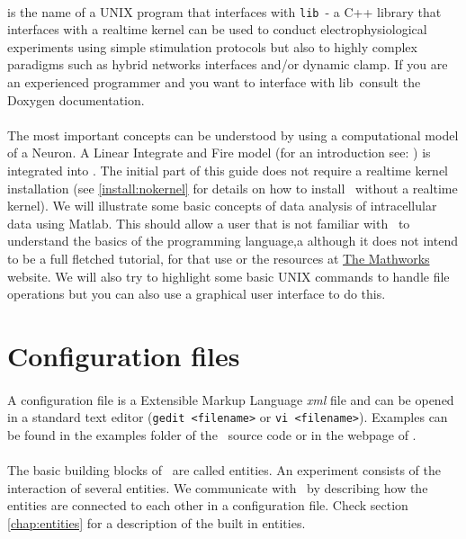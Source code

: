 \paragraph{}
\textbf{\progname} is the name of a UNIX program that interfaces with \texttt{lib\progname}\  - a C++ library that interfaces with a realtime kernel can be used to conduct electrophysiological experiments using simple stimulation protocols but also to highly complex paradigms such as hybrid networks interfaces and/or dynamic clamp. If you are an experienced programmer and you want to interface with lib\progname\, consult the Doxygen documentation.

\paragraph{}
The most important concepts can be understood by using a computational model of a Neuron. A Linear Integrate and Fire model (for an introduction see: \cite{Koch:1989}) is integrated into \progname. The initial part of this guide does not require a realtime kernel installation (see \ref{install:nokernel} for details on how to install \progname\ without a realtime kernel).
We will illustrate some basic concepts of data analysis of intracellular data using Matlab. This should allow a user that is not familiar with \matlab\ to understand the basics of the programming language,a although it does not intend to be a full fletched tutorial, for that use \cite{wallisch2011} or the resources at \href{http://www.mathworks.com}{The Mathworks} website. We will also try to highlight some basic UNIX commands to handle file operations but you can also use a graphical user interface to do this. 

\section{Configuration files}
\paragraph{}
A configuration file is a Extensible Markup Language \emph{xml} file and can be opened in a standard text editor (\texttt{gedit <filename>} or \texttt{vi <filename>}). Examples can be found in the examples folder of the \progname\ source code or in the webpage of \href{http://www.tnb.ua.ac.be}{\progname}.

\paragraph{}
The basic building blocks of \progname\ are called entities. An experiment consists of the interaction of several entities. We communicate with \progname\ by describing how the entities are connected to each other in a configuration file. Check section \ref{chap:entities} for a description of the built in entities.

